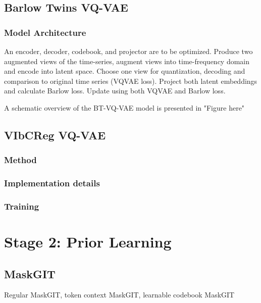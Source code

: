 \documentclass[../../thesis.tex]{subfiles}
\begin{document}
\subsection{Barlow Twins VQ-VAE}
\subsubsection{Model Architecture}


An encoder, decoder, codebook, and projector are to be optimized. Produce two augmented views of the time-series, augment views into time-frequency domain and encode into latent space. Choose one view for quantization, decoding and comparison to original time series (VQVAE loss). Project both latent embeddings and calculate Barlow loss. Update using both VQVAE and Barlow loss.

A schematic overview of the BT-VQ-VAE model is presented in "Figure here"



\subsection{VIbCReg VQ-VAE}

\subsubsection{Method}

\subsubsection{Implementation details}

\subsubsection{Training}

\section{Stage 2: Prior Learning}

\subsection{MaskGIT}
Regular MaskGIT, token context MaskGIT, learnable codebook MaskGIT
\end{document}
